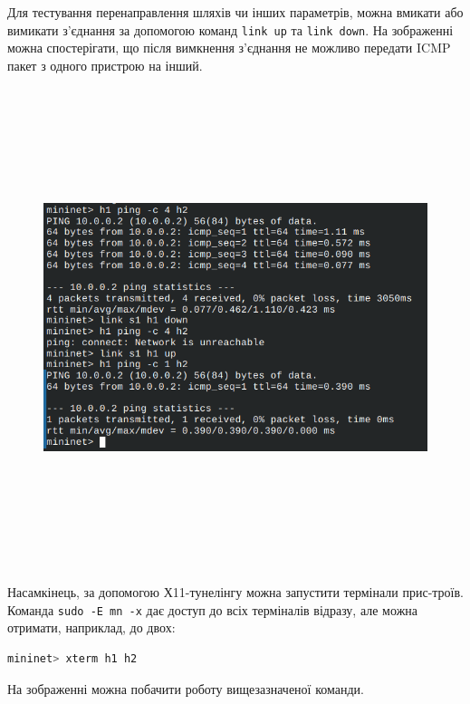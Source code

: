 \documentclass[14pt, a4paper]{extreport}
\begin{document}
	Для тестування перенаправлення шляхів чи інших параметрів, можна вмикати або вимикати з'єднання за допомогою команд \texttt{link up} та \texttt{link down}. На зображенні можна спостерігати, що після вимкнення з'єднання не можливо передати ICMP пакет з одного пристрою на інший.
	
	\begin{figure}[H]
		\centering
		\includegraphics[height=14cm, width=18cm]{15} 
	\end{figure}
	
	Насамкінець, за допомогою Х11-тунелінгу можна запустити термінали прис\hyp{}троїв. Команда \texttt{sudo -E mn -x} дає доступ до всіх терміналів відразу, але можна отримати, наприклад, до двох:
	
	\begin{lstlisting}[language=Bash]
		mininet> xterm h1 h2\end{lstlisting}
	
	На зображенні можна побачити роботу вищезазначеної команди.
	
\end{document}
